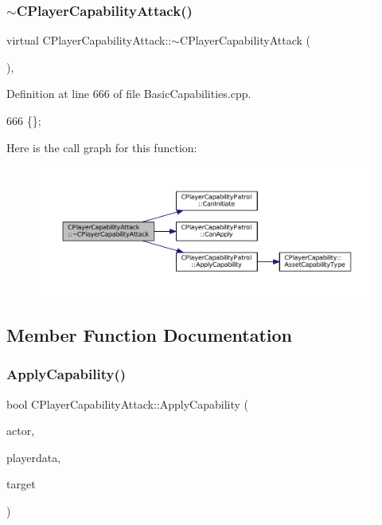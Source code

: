 \subsubsection{\texorpdfstring{$\sim$\+C\+Player\+Capability\+Attack()}{~CPlayerCapabilityAttack()}}
{\footnotesize\ttfamily virtual C\+Player\+Capability\+Attack\+::$\sim$\+C\+Player\+Capability\+Attack (\begin{DoxyParamCaption}{ }\end{DoxyParamCaption})\hspace{0.3cm}{\ttfamily [inline]}, {\ttfamily [virtual]}}



Definition at line 666 of file Basic\+Capabilities.\+cpp.


\begin{DoxyCode}
666 \{\};
\end{DoxyCode}
Here is the call graph for this function\+:
\nopagebreak
\begin{figure}[H]
\begin{center}
\leavevmode
\includegraphics[width=350pt]{classCPlayerCapabilityAttack_ac18875f6e891a2e8b805ed42bb001bb3_cgraph}
\end{center}
\end{figure}


\subsection{Member Function Documentation}
\hypertarget{classCPlayerCapabilityAttack_a536095f572f9f6af786eaec0376f3771}{}\label{classCPlayerCapabilityAttack_a536095f572f9f6af786eaec0376f3771} 
\subsubsection{\texorpdfstring{Apply\+Capability()}{ApplyCapability()}}
{\footnotesize\ttfamily bool C\+Player\+Capability\+Attack\+::\+Apply\+Capability (\begin{DoxyParamCaption}\item[{std\+::shared\+\_\+ptr$<$ \hyperlink{classCPlayerAsset}{C\+Player\+Asset} $>$}]{actor,  }\item[{std\+::shared\+\_\+ptr$<$ \hyperlink{classCPlayerData}{C\+Player\+Data} $>$}]{playerdata,  }\item[{std\+::shared\+\_\+ptr$<$ \hyperlink{classCPlayerAsset}{C\+Player\+Asset} $>$}]{target }\end{DoxyParamCaption})\hspace{0.3cm}{\ttfamily [virtual]}}



